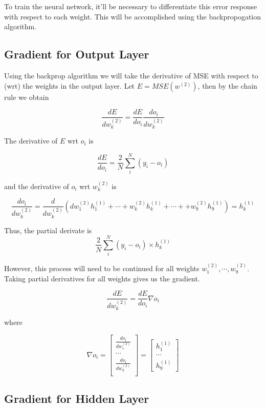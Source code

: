 \documentclass[11pt]{article}%
\begin{document}
To train the neural network, it'll be necessary to differentiate this error response with respect to each weight. This will be accomplished using the backpropogation algorithm.


\subsection{Gradient for Output Layer}

	Using the backprop algorithm we will take the derivative of MSE with respect to (wrt) the weights in the output layer. Let $E = MSE(w^{(2)})$, then by the chain rule we obtain

	$$
	\frac{dE}{dw^{(2)}_k} = \frac{dE}{do_i} \frac{do_i}{dw^{(2)}_k}
	$$

	The derivative of $E$ wrt $o_i$ is 

	$$
	\frac{dE}{do_i} = \frac{2}{N}  \sum^N_{i}  (y_i - o_i)
	$$

	and the derivative of $o_i$ wrt $w^{(2)}_k$ is
	
	$$
	\frac{do_i}{dw^{(2)}_k} = \frac{d}{dw^{(2)}_k}(dw^{(2)}_1 h^{(1)}_1+ \cdots + w^{(2)}_k h^{(1)}_k + \cdots + + w^{(2)}_9 h^{(1)}_9) = h^{(1)}_k
	$$

	Thus, the partial derivate is 
	$$
	\frac{2}{N}  \sum^N_{i}  (y_i - o_i) \times h^{(1)}_k
	$$

However, this process will need to be continued for all weights $w^{(2)}_1, \cdots, w^{(2)}_9$. Taking partial derivatives for all weights gives us the gradient.

	$$
	\frac{dE}{dw^{(2)}_k} = \frac{dE}{do_i} \nabla o_i
	$$

where 

	$$
	\nabla o_i = \begin{bmatrix}
	\frac{do_i}{dw^{(2)}_1} \\ 
	\cdots \\ 
	\frac{do_i}{dw^{(2)}_9} \\ 
	\end{bmatrix}
	= \begin{bmatrix}
	h^{(1)}_1 \\
	\cdots \\
	h^{(1)}_9
	\end{bmatrix}
	$$







\subsection{Gradient for Hidden Layer}
\end{document}
